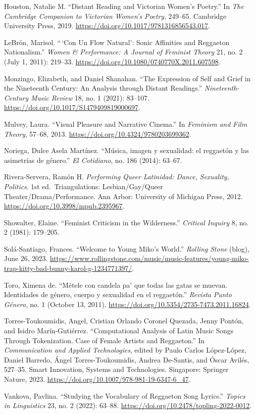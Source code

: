 \documentclass[
  letterpaper,
  DIV=11,
  numbers=noendperiod]{scrartcl}
\begin{document}
Houston, Natalie M. ``Distant Reading and Victorian Women's Poetry.'' In
\emph{The Cambridge Companion to Victorian Women's Poetry}, 249--65.
Cambridge University Press, 2019.
\url{https://doi.org/10.1017/9781316856543.017}.

LeBrón, Marisol. ``\,`Con Un Flow Natural': Sonic Affinities and
Reggaeton Nationalism.'' \emph{Women \& Performance: A Journal of
Feminist Theory} 21, no. 2 (July 1, 2011): 219--33.
\url{https://doi.org/10.1080/0740770X.2011.607598}.

Monzingo, Elizabeth, and Daniel Shanahan. ``The Expression of Self and
Grief in the Nineteenth Century: An Analysis through Distant Readings.''
\emph{Nineteenth-Century Music Review} 18, no. 1 (2021): 83--107.
\url{https://doi.org/10.1017/S1479409819000697}.

Mulvey, Laura. ``Visual Pleasure and Narrative Cinema.'' In
\emph{Feminism and Film Theory}, 57--68, 2013.
\url{https://doi.org/10.4324/9780203699362}.

Noriega, Dulce Asela Martínez. ``Música, imagen y sexualidad: el
reggaetón y las asimetrías de género.'' \emph{El Cotidiano}, no. 186
(2014): 63--67.

Rivera-Servera, Ramón H. \emph{Performing Queer Latinidad: Dance,
Sexuality, Politics}. 1st ed.~Triangulations: Lesbian/Gay/Queer
Theater/Drama/Performance. Ann Arbor: University of Michigan Press,
2012. \url{https://doi.org/10.3998/mpub.2395967}.

Showalter, Elaine. ``Feminist Criticism in the Wilderness.''
\emph{Critical Inquiry} 8, no. 2 (1981): 179--205.

Solá-Santiago, Frances. ``Welcome to Young Miko's World.'' \emph{Rolling
Stone} (blog), June 26, 2023.
\url{https://www.rollingstone.com/music/music-features/young-miko-trap-kitty-bad-bunny-karol-g-1234771397/}.

Toro, Ximena de. ``Métele con candela pa' que todas las gatas se muevan.
Identidades de género, cuerpo y sexualidad en el reggaetón.''
\emph{Revista Punto Género}, no. 1 (October 13, 2011).
\url{https://doi.org/10.5354/2735-7473.2011.16824}.

Torres-Toukoumidis, Angel, Cristian Orlando Coronel Quezada, Jenny
Pontón, and Isidro Marín-Gutiérrez. ``Computational Analysis of Latin
Music Songs Through Tokenization. Case of Female Artists and
Reggaeton.'' In \emph{Communication and Applied Technologies}, edited by
Paulo Carlos López-López, Daniel Barredo, Ángel Torres-Toukoumidis,
Andrea De-Santis, and Óscar Avilés, 527--35. Smart Innovation, Systems
and Technologies. Singapore: Springer Nature, 2023.
\url{https://doi.org/10.1007/978-981-19-6347-6_47}.

Vankova, Pavlina. ``Studying the Vocabulary of Reggaeton Song Lyrics.''
\emph{Topics in Linguistics} 23, no. 2 (2022): 63--88.
\url{https://doi.org/10.2478/topling-2022-0012}.
\end{document}
